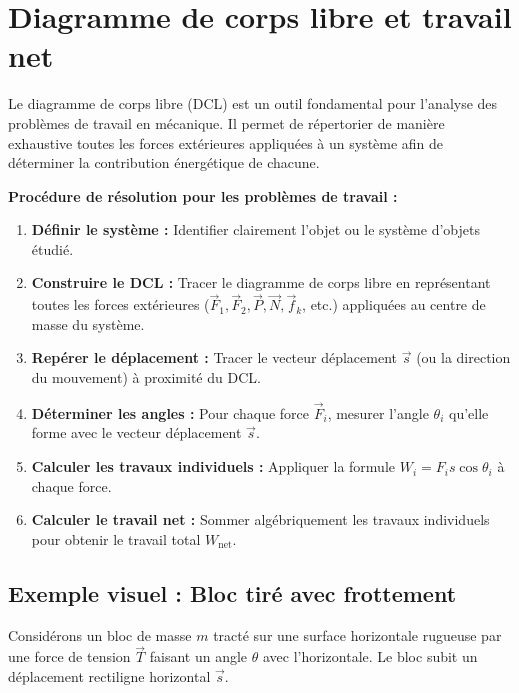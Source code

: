 \documentclass[11pt,openany]{book}
\begin{document}
\section{Diagramme de corps libre et travail net}

Le diagramme de corps libre (DCL) est un outil fondamental pour l'analyse des problèmes de travail en mécanique. Il permet de répertorier de manière exhaustive toutes les forces extérieures appliquées à un système afin de déterminer la contribution énergétique de chacune.

\begin{methode}
\textbf{Procédure de résolution pour les problèmes de travail :}

\begin{enumerate}
    \item \textbf{Définir le système :} Identifier clairement l'objet ou le système d'objets étudié.
    \item \textbf{Construire le DCL :} Tracer le diagramme de corps libre en représentant toutes les forces extérieures ($\vec{F}_1, \vec{F}_2, \vec{P}, \vec{N}, \vec{f}_k$, etc.) appliquées au centre de masse du système.
    \item \textbf{Repérer le déplacement :} Tracer le vecteur déplacement $\vec{s}$ (ou la direction du mouvement) à proximité du DCL.
    \item \textbf{Déterminer les angles :} Pour chaque force $\vec{F}_i$, mesurer l'angle $\theta_i$ qu'elle forme avec le vecteur déplacement $\vec{s}$.
    \item \textbf{Calculer les travaux individuels :} Appliquer la formule $W_i = F_i s \cos\theta_i$ à chaque force.
    \item \textbf{Calculer le travail net :} Sommer algébriquement les travaux individuels pour obtenir le travail total $W_{\text{net}}$.
\end{enumerate}
\end{methode}

\subsection*{Exemple visuel : Bloc tiré avec frottement}

Considérons un bloc de masse $m$ tracté sur une surface horizontale rugueuse par une force de tension $\vec{T}$ faisant un angle $\theta$ avec l'horizontale. Le bloc subit un déplacement rectiligne horizontal $\vec{s}$.
\end{document}
